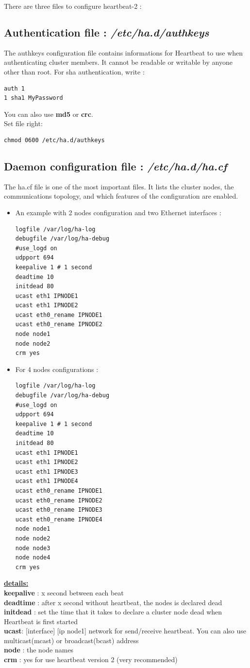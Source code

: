\documentclass[a4paper,10pt]{report}
\begin{document}
There are three files to configure heartbeat-2 :
\subsection{Authentication file : \textit{/etc/ha.d/authkeys}}
The authkeys configuration file contains informations for Heartbeat to use when authenticating cluster members. It cannot be readable or writable by anyone other than root. For sha authentication, write :
\begin{lstlisting}
auth 1
1 sha1 MyPassword
\end{lstlisting}
You can also use \textbf{md5} or \textbf{crc}.\\
Set file right:
\begin{lstlisting}
chmod 0600 /etc/ha.d/authkeys
\end{lstlisting}

\subsection{Daemon configuration file : \textit{/etc/ha.d/ha.cf}}

The ha.cf file is one of the most important files. It lists the cluster nodes, the communications topology, and which features of the configuration are enabled. 
\begin{itemize}
\item An example with 2 nodes configuration and two Ethernet interfaces :
\begin{lstlisting}
logfile /var/log/ha-log
debugfile /var/log/ha-debug
#use_logd on
udpport 694
keepalive 1 # 1 second
deadtime 10
initdead 80
ucast eth1 IPNODE1
ucast eth1 IPNODE2
ucast eth0_rename IPNODE1
ucast eth0_rename IPNODE2
node node1
node node2
crm yes
\end{lstlisting}

\item For 4 nodes configurations :
\begin{lstlisting}
logfile /var/log/ha-log
debugfile /var/log/ha-debug
#use_logd on
udpport 694
keepalive 1 # 1 second
deadtime 10
initdead 80
ucast eth1 IPNODE1
ucast eth1 IPNODE2
ucast eth1 IPNODE3
ucast eth1 IPNODE4
ucast eth0_rename IPNODE1
ucast eth0_rename IPNODE2
ucast eth0_rename IPNODE3
ucast eth0_rename IPNODE4
node node1
node node2
node node3
node node4
crm yes
\end{lstlisting}
\end{itemize}

\textbf{\underline{details:}}\\
\textbf{keepalive} : x second between each beat\\
\textbf{deadtime} : after x second without heartbeat, the nodes is declared dead\\
\textbf{initdead} : set the time that it takes to declare a cluster node dead when Heartbeat is first started\\
\textbf{ucast}: [interface] [ip node1] network for send/receive heartbeat. You can also use multicast(mcast) or broadcast(bcast) address\\
\textbf{node} : the node names\\
\textbf{crm} : yes for use heartbeat version 2 (very recommended)\\
\end{document}
